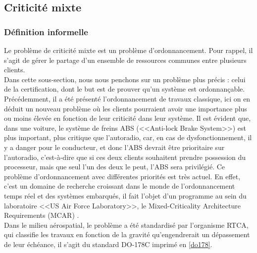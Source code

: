 \documentclass[12pt,a4paper,oneside]{book}
\theoremstyle{break}
\theoremstyle{breakplain}
\begin{document}
\pagebreak

\subsection{Criticité mixte}
\subsubsection{Définition informelle}
Le problème de criticité mixte est un problème d'ordonnancement. Pour rappel, il s'agit de gérer le partage d'un ensemble de ressources communes entre plusieurs clients.\\

Dans cette sous-section, nous nous penchons sur un problème plus précis : celui de la certification, dont le but est de prouver qu'un système est ordonnançable.\\

Précédemment, il a été présenté l'ordonnancement de travaux classique, ici on en déduit un nouveau problème où les clients pourraient avoir une importance plus ou moins élevée en fonction de leur criticité dans leur système. 
Il est évident que, dans une voiture, le système de freins ABS (<<Anti-lock Brake System>>) est plus important, plus critique que l'autoradio, car, en cas de dysfonctionnement, il y a danger pour le conducteur, et donc l'ABS devrait être prioritaire sur l'autoradio, c'est-à-dire que si ces deux clients souhaitent prendre possession du processeur, mais que seul l'un des deux le peut, l'ABS sera privilégié. Ce problème d'ordonnancement avec différentes priorités est très actuel. En effet, c'est un domaine de recherche croissant dans le monde de l'ordonnancement temps réel et des systèmes embarqués, il fait l'objet d'un programme au sein du laboratoire <<US Air Force Laboratory>>, le Mixed-Criticality Architecture Requirements (MCAR) \cite{de2009scheduling}.\\
Dans le milieu aérospatial, le problème a été standardisé par l'organisme RTCA, qui classifie les travaux en fonction de la gravité qu'engendrerait un dépassement de leur échéance, il s'agit du standard DO-178C imprimé en \autoref{do178}.\\
\end{document}
